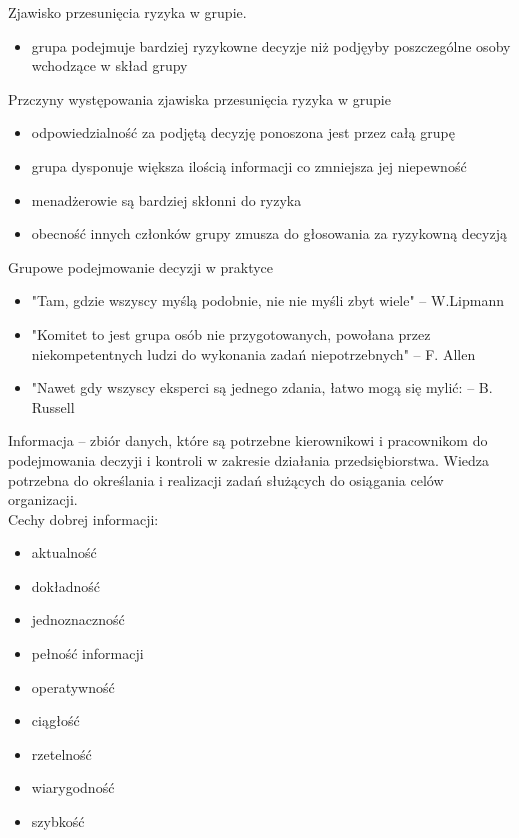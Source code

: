 \documentclass[a4paper,10pt]{report}
\begin{document}
\noindent Zjawisko przesunięcia ryzyka w grupie.
\begin{itemize}
	\item grupa podejmuje bardziej ryzykowne decyzje niż podjęyby poszczególne osoby wchodzące w skład grupy
\end{itemize}

\noindent Przczyny występowania zjawiska przesunięcia ryzyka w grupie
\begin{itemize}
	\item odpowiedzialność za podjętą decyzję ponoszona jest przez całą grupę
	\item grupa dysponuje większa ilością informacji co zmniejsza jej niepewność
	\item menadżerowie są bardziej skłonni do ryzyka
	\item obecność innych członków grupy zmusza do głosowania za ryzykowną decyzją
\end{itemize}

\noindent Grupowe podejmowanie decyzji w praktyce
\begin{itemize}
	\item "Tam, gdzie wszyscy myślą podobnie, nie nie myśli zbyt wiele" -- W.Lipmann
	\item "Komitet to jest grupa osób nie przygotowanych, powołana przez niekompetentnych ludzi do wykonania zadań niepotrzebnych" -- F. Allen
	\item "Nawet gdy wszyscy eksperci są jednego zdania, łatwo mogą się mylić: -- B. Russell
\end{itemize}

Informacja -- zbiór danych, które są potrzebne kierownikowi i pracownikom do podejmowania deczyji i kontroli w zakresie działania przedsiębiorstwa. Wiedza potrzebna do określania i realizacji zadań służących do osiągania celów organizacji.\\

\noindent Cechy dobrej informacji:
\begin{itemize}
	\item aktualność
	\item dokładność
	\item jednoznaczność
	\item pełność informacji
	\item operatywność
	\item ciągłość
	\item rzetelność
	\item wiarygodność
	\item szybkość
\end{itemize}
\end{document}
